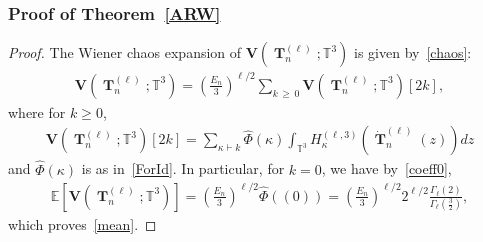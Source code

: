 \documentclass[AHL,Unicode,longabstracts,published]{cedram}
\DeclareMathOperator{\bT}{\mathbf{T}}
\newcommand{\bfv}{\mathbf{V}}
\newcommand{\T}{\mathbb{T}^3}
\newcommand{\E}[1]{\mathbb{E}\left[#1\right]}
\begin{document}
\subsubsection*{Proof of Theorem~\ref{ARW}}
\begin{proof}
The Wiener chaos expansion of $\bfv(\bT_n^{(\ell)};\T)$ is given by~\eqref{chaos}:
\begin{gather}\label{chaosARW}
\bfv(\bT_n^{(\ell)};\T) = \left(\frac{E_n}{3}\right)^{\ell/2}\sum_{k \,\geq\,0} \bfv\left(\bT_n^{(\ell)};\T\right)[2k],
\end{gather}
where for $k\geq0$,
\begin{gather*}
\bfv\left(\bT_n^{(\ell)};\T\right)[2k] = \sum_{\kappa \vdash k} \widehat{\Phi}(\kappa) \int_{\T} H_{\kappa}^{(\ell,3)}\left(\dot{\bT}_n^{(\ell)}(z)\right) dz
\end{gather*}
and $\widehat{\Phi}(\kappa)$ is as in~\eqref{ForId}. In particular, for $k=0$, we have by~\eqref{coeff0},
\begin{gather*}
\E{\bfv\left(\bT_n^{(\ell)};\T\right)} =
\left(\frac{E_n}{3}\right)^{\ell/2} \widehat{\Phi}((0)) =
\left(\frac{E_n}{3}\right)^{\ell/2} 2^{\ell/2}\frac{\Gamma_{\ell}(2)}{\Gamma_{\ell}\left(\frac{3}{2}\right)},
\end{gather*}
which proves~\eqref{mean}.



\end{proof}
\end{document}
